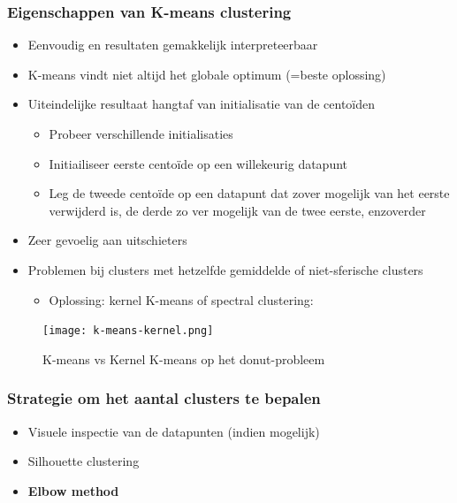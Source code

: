\documentclass{article}
\begin{document}
\subsubsection{Eigenschappen van K-means clustering}

\begin{itemize}
    \item Eenvoudig en resultaten gemakkelijk interpreteerbaar
    \item K-means vindt niet altijd het globale optimum (=beste oplossing)
    \item Uiteindelijke resultaat hangtaf van initialisatie van de centoïden
    \begin{itemize}
        \item Probeer verschillende initialisaties
        \item Initiailiseer eerste centoïde op een willekeurig datapunt
        \item Leg de tweede centoïde op een datapunt dat zover mogelijk van het eerste verwijderd is, de derde zo ver mogelijk van de twee eerste, enzoverder
    \end{itemize}
    \item Zeer gevoelig aan uitschieters
    \item Problemen bij clusters met hetzelfde gemiddelde of niet-sferische clusters
    \begin{itemize}
        \item Oplossing: kernel K-means of spectral clustering:
    \end{itemize}
\end{itemize}

\begin{figure}[H]
    \centering
    \texttt{[image: k-means-kernel.png]}
    \caption{K-means vs Kernel K-means op het donut-probleem}
\end{figure}

\subsubsection{Strategie om het aantal clusters te bepalen}

\begin{itemize}
    \item Visuele inspectie van de datapunten (indien mogelijk)
    \item Silhouette clustering
    \item \textbf{Elbow method}
\end{itemize}
\end{document}
